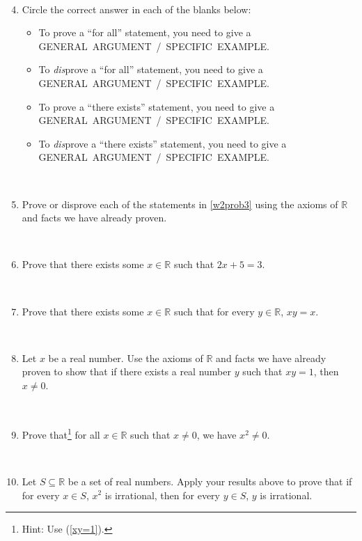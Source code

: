 \documentclass[12pt]{amsart}
\newcommand{\R}{\mathbb{R}}
\begin{document}
\


\begin{enumerate}\setcounter{enumi}{3}



\item Circle the correct answer in each of the blanks below:
{\small
\begin{itemize}
\item To prove a ``for all'' statement, you need to give a \mbox{GENERAL ARGUMENT / SPECIFIC EXAMPLE}.
\item To \emph{dis}prove a ``for all'' statement, you need to give a \mbox{GENERAL ARGUMENT / SPECIFIC EXAMPLE}.
\item To prove a ``there exists'' statement, you need to give a \mbox{GENERAL ARGUMENT / SPECIFIC EXAMPLE}.
\item To \emph{dis}prove a ``there exists'' statement, you need to give a \mbox{GENERAL ARGUMENT / SPECIFIC EXAMPLE}.
\end{itemize}
}

\

\item Prove or disprove each of the statements in \ref{w2prob3} using the axioms of $\R$ and facts we have already proven.

\

\item Prove that there exists some $x\in \R$ such that $2x+5=3$.

\


\item Prove that there exists some $x\in \R$ such that for every $y\in \R$, $xy=x$.

\

\item\label{xy=1} Let $x$ be a real number. Use the axioms of $\R$ and facts we have already proven to show that if there exists a real number $y$ such that $xy=1$, then $x\neq 0$.

\

\item Prove that\footnote{Hint: Use (\ref{xy=1}).} for all $x\in \R$ such that $x\neq 0$, we have $x^2\neq 0$.

\



\item Let $S\subseteq \R$ be a set of real numbers. Apply your results above to prove that if for every $x\in S$, $x^2$ is irrational, then for every $y\in S$, $y$ is irrational.


\end{enumerate}
\end{document}
